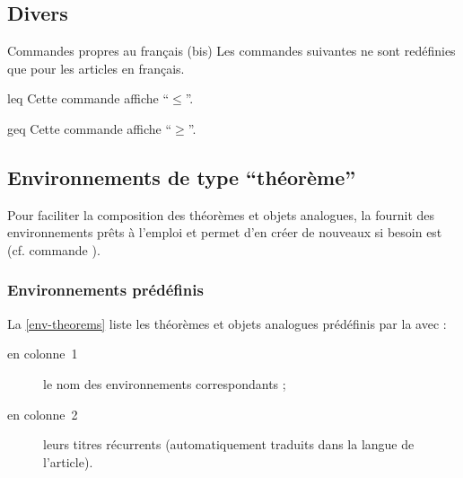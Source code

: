 \documentclass[french,nolocaltoc]{nwejmart}
\newtheorem[style=definition]{fait}
\newtheorem[title=contraventionnalisation]{ctrv}
\newtheorem[title-plural=anneaux]{anneau}
\newtheorem[title-plural=idéaux]{idéal}
\begin{document}
\subsection{Divers}

\begin{dbremark}{Commandes propres au français (bis)}{}
  Les commandes suivantes ne sont redéfinies que pour les articles en
  français.
\end{dbremark}

\begin{docCommand}{leq}{}
  Cette commande affiche \enquote{$\leq$}.
\end{docCommand}
\begin{docCommand}{geq}{}
  Cette commande affiche \enquote{$\geq$}.
\end{docCommand}

\subsection{Environnements de type \enquote{théorème}}

Pour faciliter la composition des théorèmes et objets analogues, la
\nwejmauthorcl{} fournit des environnements prêts à l'emploi et permet d'en
créer de nouveaux si besoin est (cf. commande ).

\subsubsection{Environnements prédéfinis}
\label{sec:envir-de-type}

La \vref{env-theorems} liste les théorèmes et objets analogues prédéfinis par la
\nwejmauthorcl{} avec :
\begin{description}
\item[en colonne~1] le nom des environnements correspondants ;
\item[en colonne~2] leurs titres récurrents (automatiquement traduits dans la
  langue de l'article).
\end{description}
\end{document}
